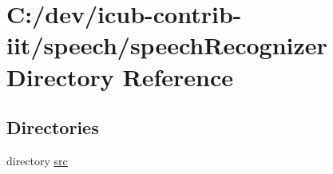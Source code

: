 \section{C\+:/dev/icub-\/contrib-\/iit/speech/speech\+Recognizer Directory Reference}
\label{dir_13f4227c1b9d50878659519750692a08}
\subsection*{Directories}
\begin{DoxyCompactItemize}
\item 
directory \hyperlink{dir_130f2423e4b03c25a1e78c71072864c6}{src}
\end{DoxyCompactItemize}
